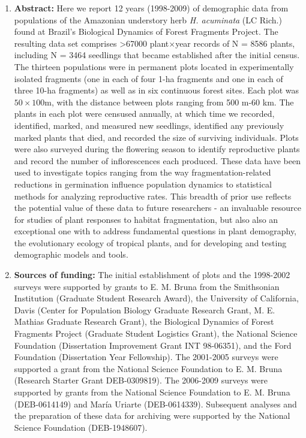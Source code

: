 \documentclass[
  12pt,
  man, donotrepeattitle,floatsintext]{apa6}
\begin{document}
\begin{enumerate}
\def\labelenumi{\arabic{enumi}.}
\setcounter{enumi}{4}
\item
  \textbf{Abstract:} Here we report 12 years (1998-2009) of demographic data from populations of the Amazonian understory herb \emph{H. acuminata} (LC Rich.) found at Brazil's Biological Dynamics of Forest Fragments Project. The resulting data set comprises \textgreater67000 plant\(\times\)year records of N = 8586 plants, including N = 3464 seedlings that became established after the initial census. The thirteen populations were in permanent plots located in experimentally isolated fragments (one in each of four 1-ha fragments and one in each of three 10-ha fragments) as well as in six continuous forest sites. Each plot was \(50\times100\)m, with the distance between plots ranging from 500 m-60 km. The plants in each plot were censused annually, at which time we recorded, identified, marked, and measured new seedlings, identified any previously marked plants that died, and recorded the size of surviving individuals. Plots were also surveyed during the flowering season to identify reproductive plants and record the number of inflorescences each produced. These data have been used to investigate topics ranging from the way fragmentation-related reductions in germination influence population dynamics to statistical methods for analyzing reproductive rates. This breadth of prior use reflects the potential value of these data to future researchers - an invaluable resource for studies of plant responses to habitat fragmentation, but also also an exceptional one with to address fundamental questions in plant demography, the evolutionary ecology of tropical plants, and for developing and testing demographic models and tools.
\item
  \textbf{Sources of funding:} The initial establishment of plots and the 1998-2002 surveys were supported by grants to E. M. Bruna from the Smithsonian Institution (Graduate Student Research Award), the University of California, Davis (Center for Population Biology Graduate Research Grant, M. E. Mathias Graduate Research Grant), the Biological Dynamics of Forest Fragments Project (Graduate Student Logistics Grant), the National Science Foundation (Dissertation Improvement Grant INT 98-06351), and the Ford Foundation (Dissertation Year Fellowship). The 2001-2005 surveys were supported a grant from the National Science Foundation to E. M. Bruna (Research Starter Grant DEB-0309819). The 2006-2009 surveys were supported by grants from the National Science Foundation to E. M. Bruna (DEB-0614149) and María Uriarte (DEB-0614339). Subsequent analyses and the preparation of these data for archiving were supported by the National Science Foundation (DEB-1948607).
\end{enumerate}
\end{document}
